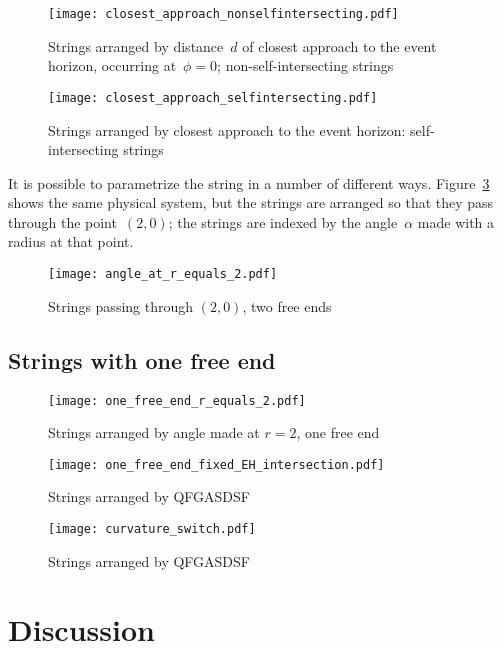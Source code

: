 \documentclass[prb,preprint]{revtex4-1}
\begin{document}
\begin{figure}[h!]
\centering
\texttt{[image: closest\_approach\_nonselfintersecting.pdf]}
\caption{Strings arranged by distance~$d$ of closest approach to the
  event horizon, occurring at~$\phi=0$; non-self-intersecting strings}
\label{closest_approach_non_self_intersecting}
\end{figure}

\begin{figure}[h!]
\centering
\texttt{[image: closest\_approach\_selfintersecting.pdf]}
\caption{Strings arranged by closest approach to the event horizon:
 self-intersecting strings}
\label{closest_approach_self_intersecting}
\end{figure}

It is possible to parametrize the string in a number of different
ways.  Figure~\ref{angle_at_r_equals_2} shows the same physical
system, but the strings are arranged so that they pass through the
point~$\left(2,0\right)$; the strings are indexed by the
angle~$\alpha$ made with a radius at that point.

\begin{figure}[h!]
\centering
\texttt{[image: angle\_at\_r\_equals\_2.pdf]}
\caption{Strings \label{angle_at_r_equals_2} passing through
  $\left(2,0\right)$, two free ends}
\end{figure}

\subsection{Strings with one free end}

\begin{figure}[h!]
\centering
\texttt{[image: one\_free\_end\_r\_equals\_2.pdf]}
\caption{Strings arranged by angle made at $r=2$, one free end}
\label{y}
\end{figure}

\begin{figure}[h!]
\centering
\texttt{[image: one\_free\_end\_fixed\_EH\_intersection.pdf]}
\caption{Strings arranged by QFGASDSF}
\label{fixed_EH_intersection}
\end{figure}

\begin{figure}[h!]
\centering
\texttt{[image: curvature\_switch.pdf]}
\caption{Strings arranged by QFGASDSF}
\label{curvature_switch}
\end{figure}



\section{Discussion}
\end{document}
